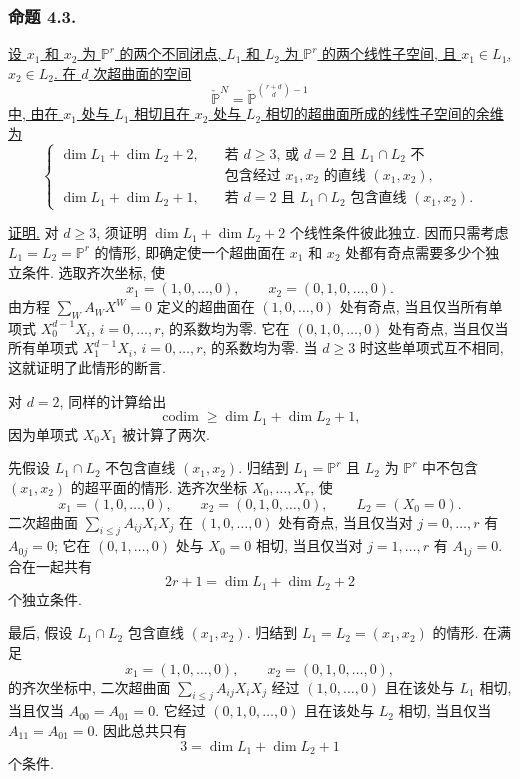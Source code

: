 \subsubsection*{命题 4.3.}
\underline{设 $x_1$ 和 $x_2$ 为 $\mathbb P^r$ 的两个不同闭点, $L_1$ 和 $L_2$ 为 $\mathbb P^r$ 的两个线性子空间, 且 $x_1\in L_1$, $x_2\in L_2$. 在 $d$ 次超曲面的空间}
\[
\check{\mathbb P}^{N}
=\check{\mathbb P}^{\binom{r+d}{d}-1}
\]
\underline{中, 由在 $x_1$ 处与 $L_1$ 相切且在 $x_2$ 处与 $L_2$ 相切的超曲面所成的线性子空间的余维为}
\[
\left\{
\begin{aligned}
\dim L_1+\dim L_2+2,
 &\quad\text{若 $d\geq3$, 或 $d=2$ 且 $L_1\cap L_2$ 不}\\[-0.2ex]
 &\quad\text{包含经过 $x_1,x_2$ 的直线 $(x_1,x_2)$},\\[1ex]
\dim L_1+\dim L_2+1,
 &\quad\text{若 $d=2$ 且 $L_1\cap L_2$ 包含直线 $(x_1,x_2)$.}
\end{aligned}
\right.
\]

\noindent\underline{证明.}
对 $d\geq3$, 须证明 $\dim L_1+\dim L_2+2$ 个线性条件彼此独立. 因而只需考虑 $L_1=L_2=\mathbb P^r$ 的情形, 即确定使一个超曲面在 $x_1$ 和 $x_2$ 处都有奇点需要多少个独立条件. 选取齐次坐标, 使
\[
x_1=(1,0,\ldots,0),\qquad x_2=(0,1,0,\ldots,0).
\]
由方程 $\sum_W A_WX^W=0$ 定义的超曲面在 $(1,0,\ldots,0)$ 处有奇点, 当且仅当所有单项式 $X_0^{d-1}X_i$, $i=0,\ldots,r$, 的系数均为零. 它在 $(0,1,0,\ldots,0)$ 处有奇点, 当且仅当所有单项式 $X_1^{d-1}X_i$, $i=0,\ldots,r$, 的系数均为零. 当 $d\geq3$ 时这些单项式互不相同, 这就证明了此情形的断言.

对 $d=2$, 同样的计算给出
\[
\operatorname{codim}\geq\dim L_1+\dim L_2+1,
\]
因为单项式 $X_0X_1$ 被计算了两次.

先假设 $L_1\cap L_2$ 不包含直线 $(x_1,x_2)$. 归结到 $L_1=\mathbb P^r$ 且 $L_2$ 为 $\mathbb P^r$ 中不包含 $(x_1,x_2)$ 的超平面的情形. 选齐次坐标 $X_0,\ldots,X_r$, 使
\[
x_1=(1,0,\ldots,0),\qquad x_2=(0,1,0,\ldots,0),
\qquad L_2=(X_0=0).
\]
二次超曲面 $\sum_{i\leq j}A_{ij}X_iX_j$ 在 $(1,0,\ldots,0)$ 处有奇点, 当且仅当对 $j=0,\ldots,r$ 有 $A_{0j}=0$; 它在 $(0,1,\ldots,0)$ 处与 $X_0=0$ 相切, 当且仅当对 $j=1,\ldots,r$ 有 $A_{1j}=0$. 合在一起共有
\[
2r+1=\dim L_1+\dim L_2+2
\]
个独立条件.

最后, 假设 $L_1\cap L_2$ 包含直线 $(x_1,x_2)$. 归结到 $L_1=L_2=(x_1,x_2)$ 的情形. 在满足
\[
x_1=(1,0,\ldots,0),\qquad x_2=(0,1,0,\ldots,0),
\]
的齐次坐标中, 二次超曲面 $\sum_{i\leq j}A_{ij}X_iX_j$ 经过 $(1,0,\ldots,0)$ 且在该处与 $L_1$ 相切, 当且仅当 $A_{00}=A_{01}=0$. 它经过 $(0,1,0,\ldots,0)$ 且在该处与 $L_2$ 相切, 当且仅当 $A_{11}=A_{01}=0$. 因此总共只有
\[
3=\dim L_1+\dim L_2+1
\]
个条件.